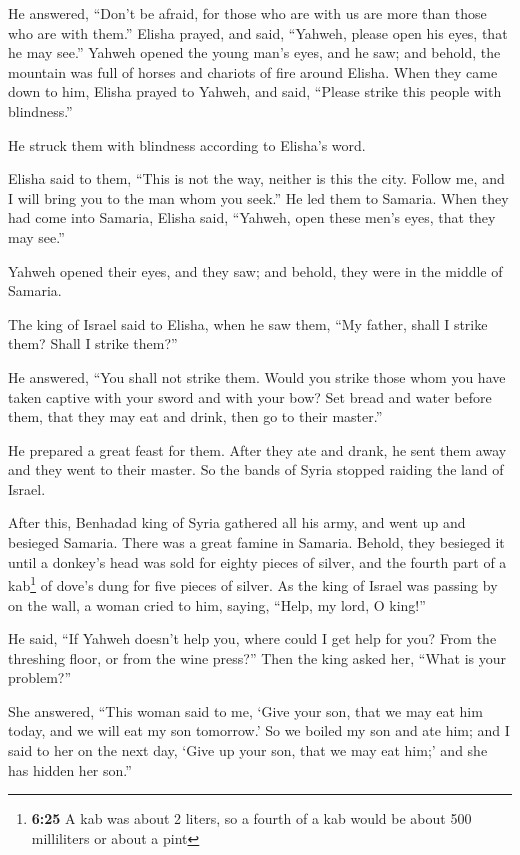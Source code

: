  He answered, ``Don't be afraid, for those who are with
us are more than those who are with them.''  Elisha
prayed, and said, ``Yahweh, please open his eyes, that he may see.''
Yahweh opened the young man's eyes, and he saw; and behold, the mountain
was full of horses and chariots of fire around Elisha. 
When they came down to him, Elisha prayed to Yahweh, and said, ``Please
strike this people with blindness.''

He struck them with blindness according to Elisha's word.

 Elisha said to them, ``This is not the way, neither is
this the city. Follow me, and I will bring you to the man whom you
seek.'' He led them to Samaria.  When they had come into
Samaria, Elisha said, ``Yahweh, open these men's eyes, that they may
see.''

Yahweh opened their eyes, and they saw; and behold, they were in the
middle of Samaria.

 The king of Israel said to Elisha, when he saw them,
``My father, shall I strike them? Shall I strike them?''

 He answered, ``You shall not strike them. Would you
strike those whom you have taken captive with your sword and with your
bow? Set bread and water before them, that they may eat and drink, then
go to their master.''

 He prepared a great feast for them. After they ate and
drank, he sent them away and they went to their master. So the bands of
Syria stopped raiding the land of Israel.

 After this, Benhadad king of Syria gathered all his
army, and went up and besieged Samaria.  There was a
great famine in Samaria. Behold, they besieged it until a donkey's head
was sold for eighty pieces of silver, and the fourth part of a
kab\footnote{\textbf{6:25} A kab was about 2 liters, so a fourth of a
  kab would be about 500 milliliters or about a pint} of dove's dung for
five pieces of silver.  As the king of Israel was passing
by on the wall, a woman cried to him, saying, ``Help, my lord, O king!''

 He said, ``If Yahweh doesn't help you, where could I get
help for you? From the threshing floor, or from the wine press?''
 Then the king asked her, ``What is your problem?''

She answered, ``This woman said to me, `Give your son, that we may eat
him today, and we will eat my son tomorrow.'  So we
boiled my son and ate him; and I said to her on the next day, `Give up
your son, that we may eat him;' and she has hidden her son.''

